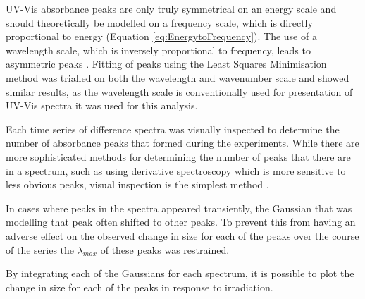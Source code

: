 UV-Vis absorbance peaks are only truly symmetrical on an energy scale and should theoretically be modelled on a frequency scale, which is directly proportional to energy (Equation \ref{eq:EnergytoFrequency}). The use of a wavelength scale, which is inversely proportional to frequency, leads to asymmetric peaks \cite{Antonov1997}. Fitting of peaks using the Least Squares Minimisation method was trialled on both the wavelength and wavenumber scale and showed similar results, as the wavelength scale is conventionally used for presentation of UV-Vis spectra it was used for this analysis. 

Each time series of difference spectra was visually inspected to determine the number of absorbance peaks that formed during the experiments. While there are more sophisticated methods for determining the number of peaks that there are in a spectrum, such as using derivative spectroscopy which is more sensitive to less obvious peaks, visual inspection is the simplest method \cite{Antonov2000}. 

In cases where peaks in the spectra appeared transiently, the Gaussian that was modelling that peak often shifted to other peaks. To prevent this from having an adverse effect on the observed change in size for each of the peaks over the course of the series the $\lambda_{max}$ of these peaks was restrained.
 
By integrating each of the Gaussians for each spectrum, it is possible to plot the change in size for each of the peaks in response to irradiation.  

  




   

